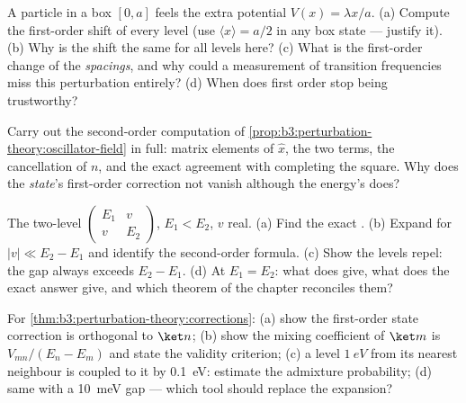 \begin{exercise}[$\star$]\label{exo:b3:perturbation-theory:1}
A particle in a box $[0, a]$ feels the extra potential $V(x) =
\lambda x/a$. (a) Compute the first-order shift of every level
(use $\langle x\rangle = a/2$ in any box state --- justify it).
(b) Why is the shift the same for all levels here? (c) What is the
first-order change of the \emph{spacings}, and why could a
measurement of transition frequencies miss this perturbation
entirely? (d) When does first order stop being trustworthy?
\end{exercise}

\begin{exercise}[$\star$]\label{exo:b3:perturbation-theory:2}
Carry out the second-order computation of
\cref{prop:b3:perturbation-theory:oscillator-field} in full: matrix
elements of $\hat x$, the two terms, the cancellation of $n$, and
the exact agreement with completing the square. Why does the
\emph{state}'s first-order correction not vanish although the
energy's does?
\end{exercise}

\begin{exercise}[$\star$]\label{exo:b3:perturbation-theory:3}
The two-level  $\begin{pmatrix}E_1 & v\\ v &
E_2\end{pmatrix}$, $E_1 < E_2$, $v$ real. (a) Find the exact
. (b) Expand for $|v| \ll E_2 - E_1$ and identify the
second-order formula. (c) Show the levels repel: the gap always
exceeds $E_2 - E_1$. (d) At $E_1 = E_2$: what does  give, what does the exact answer give, and which theorem of
the chapter reconciles them?
\end{exercise}

\begin{exercise}[$\star$]\label{exo:b3:perturbation-theory:4}
For \cref{thm:b3:perturbation-theory:corrections}: (a) show the
first-order state correction is orthogonal to $\ket n$; (b) show
the mixing coefficient of $\ket m$ is $V_{mn}/(E_n - E_m)$ and
state the validity criterion; (c) a level $\qty{1}{eV}$ from its
nearest neighbour is coupled to it by \qty{0.1}{eV}: estimate the
admixture probability; (d) same with a \qty{10}{meV} gap ---
which tool should replace the expansion?
\end{exercise}

